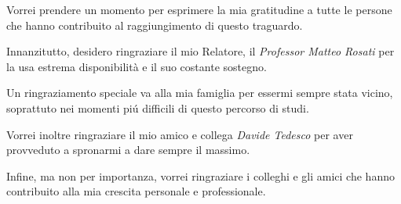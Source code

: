 Vorrei prendere un momento per esprimere la mia gratitudine a tutte le persone che hanno contribuito al raggiungimento di questo traguardo.

Innanzitutto, desidero ringraziare il mio Relatore, il \textit{Professor Matteo Rosati} per la usa estrema disponibilit\`a e il suo costante sostegno.

Un ringraziamento speciale va alla mia famiglia per essermi sempre stata vicino, soprattuto nei momenti pi\'u difficili di questo percorso di studi.

Vorrei inoltre ringraziare il mio amico e collega \textit{Davide Tedesco} per aver provveduto a spronarmi a dare sempre il massimo.

Infine, ma non per importanza, vorrei ringraziare i colleghi e gli amici che hanno contribuito alla mia crescita personale e professionale. 



